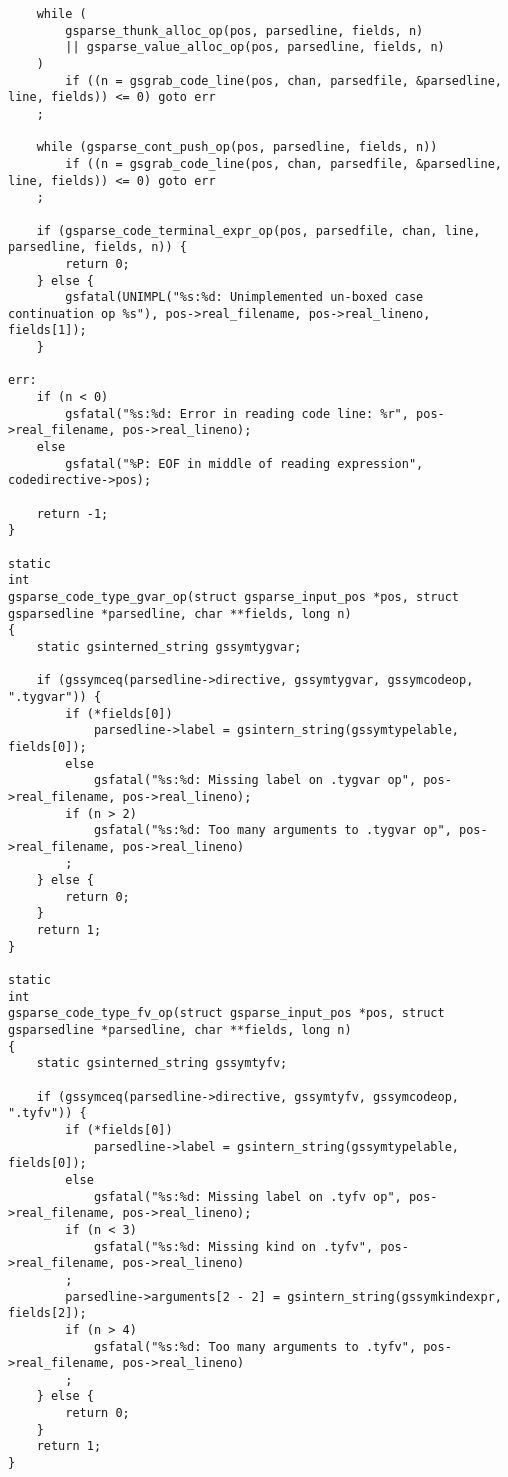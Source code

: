 \documentclass{report}
\begin{document}
\begin{verbatim}
    while (
        gsparse_thunk_alloc_op(pos, parsedline, fields, n)
        || gsparse_value_alloc_op(pos, parsedline, fields, n)
    )
        if ((n = gsgrab_code_line(pos, chan, parsedfile, &parsedline, line, fields)) <= 0) goto err
    ;

    while (gsparse_cont_push_op(pos, parsedline, fields, n))
        if ((n = gsgrab_code_line(pos, chan, parsedfile, &parsedline, line, fields)) <= 0) goto err
    ;

    if (gsparse_code_terminal_expr_op(pos, parsedfile, chan, line, parsedline, fields, n)) {
        return 0;
    } else {
        gsfatal(UNIMPL("%s:%d: Unimplemented un-boxed case continuation op %s"), pos->real_filename, pos->real_lineno, fields[1]);
    }

err:
    if (n < 0)
        gsfatal("%s:%d: Error in reading code line: %r", pos->real_filename, pos->real_lineno);
    else
        gsfatal("%P: EOF in middle of reading expression", codedirective->pos);

    return -1;
}

static
int
gsparse_code_type_gvar_op(struct gsparse_input_pos *pos, struct gsparsedline *parsedline, char **fields, long n)
{
    static gsinterned_string gssymtygvar;

    if (gssymceq(parsedline->directive, gssymtygvar, gssymcodeop, ".tygvar")) {
        if (*fields[0])
            parsedline->label = gsintern_string(gssymtypelable, fields[0]);
        else
            gsfatal("%s:%d: Missing label on .tygvar op", pos->real_filename, pos->real_lineno);
        if (n > 2)
            gsfatal("%s:%d: Too many arguments to .tygvar op", pos->real_filename, pos->real_lineno)
        ;
    } else {
        return 0;
    }
    return 1;
}

static
int
gsparse_code_type_fv_op(struct gsparse_input_pos *pos, struct gsparsedline *parsedline, char **fields, long n)
{
    static gsinterned_string gssymtyfv;

    if (gssymceq(parsedline->directive, gssymtyfv, gssymcodeop, ".tyfv")) {
        if (*fields[0])
            parsedline->label = gsintern_string(gssymtypelable, fields[0]);
        else
            gsfatal("%s:%d: Missing label on .tyfv op", pos->real_filename, pos->real_lineno);
        if (n < 3)
            gsfatal("%s:%d: Missing kind on .tyfv", pos->real_filename, pos->real_lineno)
        ;
        parsedline->arguments[2 - 2] = gsintern_string(gssymkindexpr, fields[2]);
        if (n > 4)
            gsfatal("%s:%d: Too many arguments to .tyfv", pos->real_filename, pos->real_lineno)
        ;
    } else {
        return 0;
    }
    return 1;
}


\end{verbatim}
\end{document}
